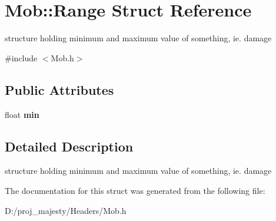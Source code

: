 \hypertarget{struct_mob_1_1_range}{}\section{Mob\+:\+:Range Struct Reference}
\label{struct_mob_1_1_range}


structure holding minimum and maximum value of something, ie. damage  




{\ttfamily \#include $<$Mob.\+h$>$}

\subsection*{Public Attributes}
\begin{DoxyCompactItemize}
\item 
float {\bfseries min}\hypertarget{struct_mob_1_1_range_acbb5d30ee5e799f286e9eac6421a279e}{}\label{struct_mob_1_1_range_acbb5d30ee5e799f286e9eac6421a279e}

\end{DoxyCompactItemize}


\subsection{Detailed Description}
structure holding minimum and maximum value of something, ie. damage 

The documentation for this struct was generated from the following file\+:\begin{DoxyCompactItemize}
\item 
D\+:/proj\+\_\+majesty/\+Headers/Mob.\+h\end{DoxyCompactItemize}
